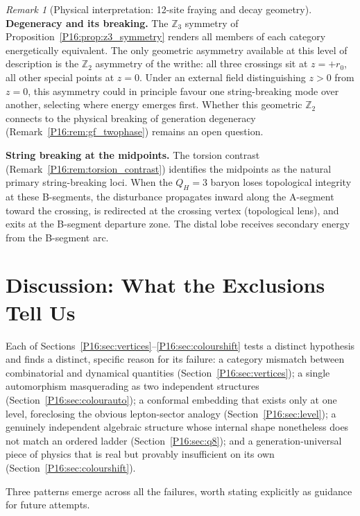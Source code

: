 \documentclass[11pt,a4paper]{article}
\theoremstyle{definition}\newtheorem{definition}[theorem]{Definition}
\theoremstyle{remark}
\newtheorem{remark}[theorem]{Remark}
\theoremstyle{definition}\newtheorem{construction}[theorem]{Construction}
\newcommand{\QH}{Q_H}
\begin{document}
\begin{remark}[Physical interpretation: 12-site fraying and decay geometry]
\textbf{Degeneracy and its breaking.}
The $\mathbb{Z}_3$ symmetry of Proposition~\ref{P16:prop:z3_symmetry}
renders all members of each category energetically equivalent.
The only geometric asymmetry available at this level of description is
the $\mathbb{Z}_2$ asymmetry of the writhe: all three crossings sit at
$z=+r_0$, all other special points at $z=0$. Under an external field
distinguishing $z>0$ from $z=0$, this asymmetry could in principle
favour one string-breaking mode over another, selecting where energy
emerges first.  Whether this geometric $\mathbb{Z}_2$ connects to the
physical breaking of generation degeneracy
(Remark~\ref{P16:rem:gf_twophase}) remains an open question.

\textbf{String breaking at the midpoints.}
The torsion contrast (Remark~\ref{P16:rem:torsion_contrast}) identifies
the midpoints as the natural primary string-breaking loci.  When the
$\QH=3$ baryon loses topological integrity at these B-segments, the
disturbance propagates inward along the A-segment toward the crossing,
is redirected at the crossing vertex (topological lens), and exits at
the B-segment departure zone.  The distal lobe receives secondary
energy from the B-segment arc.
\end{remark}

\section{Discussion: What the Exclusions Tell Us}
\label{P16:sec:open}

Each of Sections~\ref{P16:sec:vertices}--\ref{P16:sec:colourshift} tests a
distinct hypothesis and finds a distinct, specific reason for its
failure: a category mismatch between combinatorial and dynamical
quantities (Section~\ref{P16:sec:vertices}); a single automorphism
masquerading as two independent structures
(Section~\ref{P16:sec:colourauto}); a conformal embedding that exists only
at one level, foreclosing the obvious lepton-sector analogy
(Section~\ref{P16:sec:level}); a genuinely independent algebraic structure
whose internal shape nonetheless does not match an ordered ladder
(Section~\ref{P16:sec:q8}); and a generation-universal piece of physics
that is real but provably insufficient on its own
(Section~\ref{P16:sec:colourshift}).

Three patterns emerge across all the failures, worth stating
explicitly as guidance for future attempts.
\end{document}
